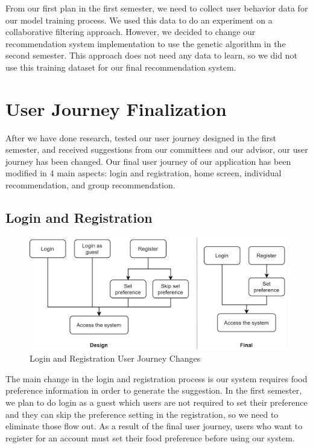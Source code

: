 \documentclass[12pt,oneside,openright,a4paper]{cpe-english-project}
\begin{document}
From our first plan in the first semester, we need to collect user behavior data for our model training process. We used this data to do an experiment on a collaborative filtering approach. However, we decided to change our recommendation system implementation to use the genetic algorithm in the second semester. This approach does not need any data to learn, so we did not use this training dataset for our final recommendation system.


\section{User Journey Finalization}

After we have done research, tested our user journey designed in the first semester, and received suggestions from our committees and our advisor, our user journey has been changed. Our final user journey of our application has been modified in 4 main aspects: login and registration, home screen, individual recommendation, and group recommendation.


\subsection{Login and Registration}

\begin{figure}[H]\centering
\includegraphics[width=350pt]{./images/4LoginandRegistrationUserJourneyChanges.png}
\caption{Login and Registration User Journey Changes}\label{fig:4LoginandRegistrationUserJourneyChanges}
\end{figure}\vspace{-24pt}

The main change in the login and registration process is our system requires food preference information in order to generate the suggestion. In the first semester, we plan to do login as a guest which users are not required to set their preference and they can skip the preference setting in the registration, so we need to eliminate those flow out. As a result of the final user journey, users who want to register for an account must set their food preference before using our system.
\end{document}
